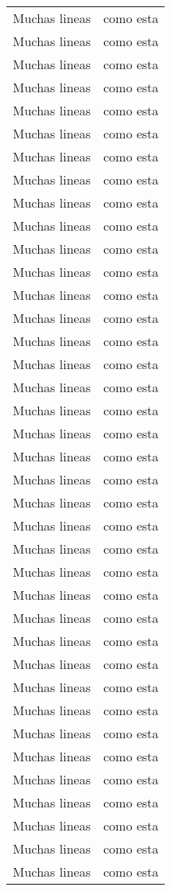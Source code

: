 \documentclass[12pt]{article}
\begin{document}
\begin{longtable}[c]{| c | c |}
 Muchas lineas & como esta\\
 Muchas lineas & como esta\\
 Muchas lineas & como esta\\
 Muchas lineas & como esta\\
 Muchas lineas & como esta\\
 Muchas lineas & como esta\\
 Muchas lineas & como esta\\
 Muchas lineas & como esta\\
 Muchas lineas & como esta\\
 Muchas lineas & como esta\\
 Muchas lineas & como esta\\
 Muchas lineas & como esta\\
 Muchas lineas & como esta\\
 Muchas lineas & como esta\\
 Muchas lineas & como esta\\
 Muchas lineas & como esta\\
 Muchas lineas & como esta\\
 Muchas lineas & como esta\\
 Muchas lineas & como esta\\
 Muchas lineas & como esta\\
 Muchas lineas & como esta\\
 Muchas lineas & como esta\\
 Muchas lineas & como esta\\
 Muchas lineas & como esta\\
 Muchas lineas & como esta\\
 Muchas lineas & como esta\\
 Muchas lineas & como esta\\
 Muchas lineas & como esta\\
 Muchas lineas & como esta\\
 Muchas lineas & como esta\\
 Muchas lineas & como esta\\
 Muchas lineas & como esta\\
 Muchas lineas & como esta\\
 Muchas lineas & como esta\\
 Muchas lineas & como esta\\
 Muchas lineas & como esta\\
 Muchas lineas & como esta\\
 Muchas lineas & como esta\\

\end{longtable}
\end{document}
